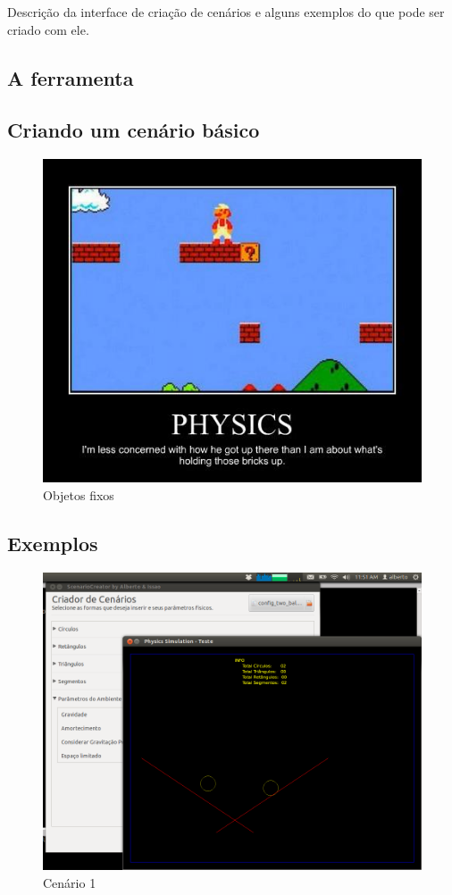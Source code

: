 Descrição da interface de criação de cenários e alguns exemplos do que pode ser criado com ele.

\subsection{A ferramenta}

\subsection{Criando um cenário básico}

\begin{figure}[H]
  \centering
  \includegraphics[scale=0.6]{images/bricks.jpg}
  \caption{Objetos fixos}
\end{figure}

\subsection{Exemplos}

\begin{figure}[H]
	\centering
	\includegraphics[scale=0.3]{images/cenario-two-balls.png}
	\caption{Cenário 1}
	\hspace{0.5cm}
\end{figure}  

